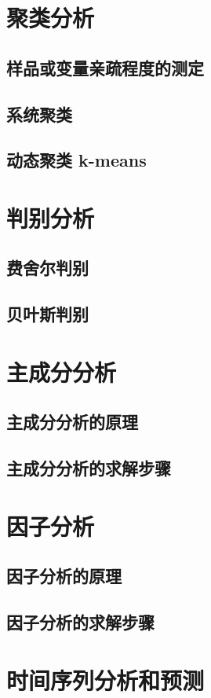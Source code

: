\chapter{聚类分析}
\section{样品或变量亲疏程度的测定}
\section{系统聚类}
\section{动态聚类 k-means}

\chapter{判别分析}
\section{费舍尔判别}
\section{贝叶斯判别}


\chapter{主成分分析}
\section{主成分分析的原理}
\section{主成分分析的求解步骤}

\chapter{因子分析}
\section{因子分析的原理}
\section{因子分析的求解步骤}

\chapter{时间序列分析和预测}
